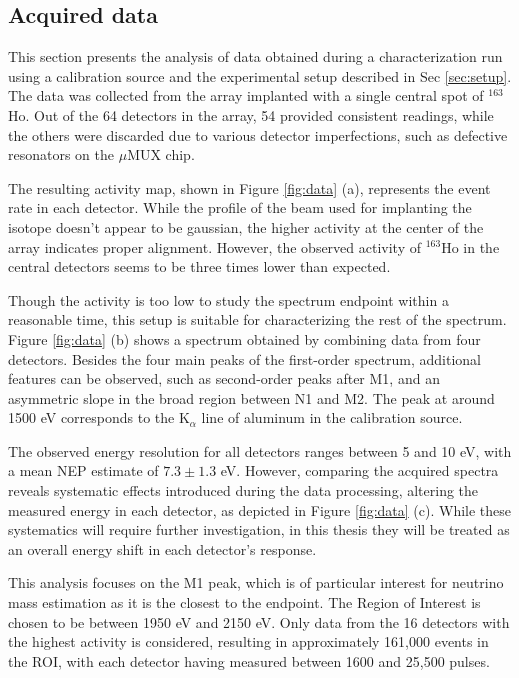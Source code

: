 \subsection{Acquired data}
This section presents the analysis of data obtained during a characterization run using a calibration source and the
experimental setup
described in Sec \ref{sec:setup}. The data was collected from the array implanted with a single central spot
of $^{163}$Ho. Out of the 64 detectors in the array, 54 provided consistent readings, while the others were discarded
due to various detector imperfections, such as defective resonators on the $\mu$MUX chip.

The resulting activity map, shown in Figure \ref{fig:data} (a), represents the event rate in each detector. While the
profile of the beam used for implanting the isotope doesn't appear to be gaussian, the higher activity at the center of
the array indicates proper alignment. However, the observed activity of $^{163}$Ho in the central detectors seems to be three times lower than expected.

Though the activity is too low to study the spectrum endpoint within a reasonable time, this setup is suitable for
characterizing the rest of the spectrum. Figure \ref{fig:data} (b) shows a spectrum obtained
by combining data from four detectors. Besides the four main peaks of the first-order spectrum, additional features can be
observed, such as second-order peaks after M1, and an asymmetric slope in the broad region between N1 and M2. The peak
at around 1500 eV corresponds to the K$_\alpha$ line of aluminum in the calibration source.

The observed energy resolution for all detectors ranges between 5 and 10 eV, with a mean NEP estimate of $7.3\pm 1.3$ eV. However, comparing the acquired spectra
reveals systematic effects introduced during the data processing, altering the measured energy in each detector, as
depicted in Figure \ref{fig:data} (c). While these systematics will require further investigation, in this thesis they
will be treated as an overall energy shift in each detector's response.

This analysis focuses on the M1 peak, which is of particular interest for neutrino mass estimation as it is the closest
to the endpoint. The Region of Interest is chosen to be between 1950 eV and 2150 eV. Only data from the 16 detectors
with the highest activity is considered, resulting in approximately 161,000 events in the ROI, with each detector having
measured between 1600 and 25,500 pulses.

